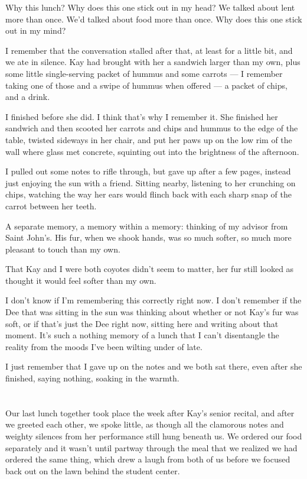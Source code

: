 Why this lunch? Why does this one stick out in my head? We talked about lent more than once. We'd talked about food more than once. Why does this one stick out in my mind?

I remember that the conversation stalled after that, at least for a little bit, and we ate in silence. Kay had brought with her a sandwich larger than my own, plus some little single-serving packet of hummus and some carrots --- I remember taking one of those and a swipe of hummus when offered --- a packet of chips, and a drink.

I finished before she did. I think that's why I remember it. She finished her sandwich and then scooted her carrots and chips and hummus to the edge of the table, twisted sideways in her chair, and put her paws up on the low rim of the wall where glass met concrete, squinting out into the brightness of the afternoon.

I pulled out some notes to rifle through, but gave up after a few pages, instead just enjoying the sun with a friend. Sitting nearby, listening to her crunching on chips, watching the way her ears would flinch back with each sharp snap of the carrot between her teeth.

A separate memory, a memory within a memory: thinking of my advisor from Saint John's. His fur, when we shook hands, was so much softer, so much more pleasant to touch than my own.

That Kay and I were both coyotes didn't seem to matter, her fur still looked as thought it would feel softer than my own.

I don't know if I'm remembering this correctly right now. I don't remember if the Dee that was sitting in the sun was thinking about whether or not Kay's fur was soft, or if that's just the Dee right now, sitting here and writing about that moment. It's such a nothing memory of a lunch that I can't disentangle the reality from the moods I've been wilting under of late.

I just remember that I gave up on the notes and we both sat there, even after she finished, saying nothing, soaking in the warmth.

\section{}

Our last lunch together took place the week after Kay's senior recital, and after we greeted each other, we spoke little, as though all the clamorous notes and weighty silences from her performance still hung beneath us. We ordered our food separately and it wasn't until partway through the meal that we realized we had ordered the same thing, which drew a laugh from both of us before we focused back out on the lawn behind the student center.

